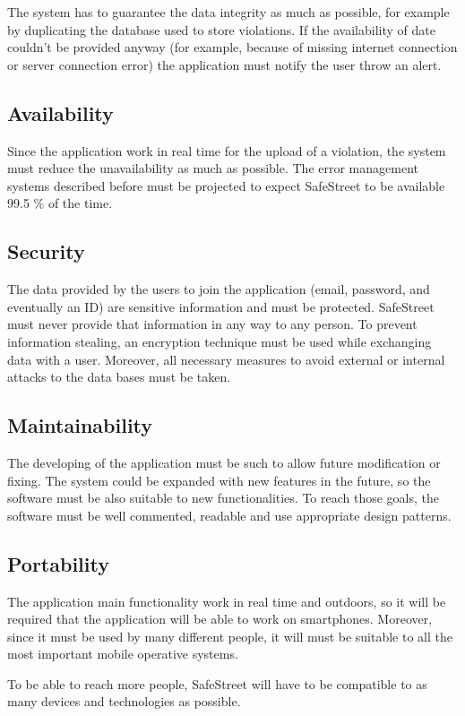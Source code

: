 \documentclass[../RASD.tex]{subfiles}
\begin{document}
            The system has to guarantee the data integrity as much as possible, for example by duplicating the database used to store violations. If the availability of date couldn’t be provided anyway (for example, because of missing internet connection or server connection error) the application must notify the user throw an alert.
            \subsection{Availability}\label{subsec:availability}
            Since the application work in real time for the upload of a violation, the system must reduce the unavailability as much as possible. The error management systems described before must be projected to expect SafeStreet to be available 99.5 \% of the time.
                    \subsection{Security}\label{subsec:security}
            The data provided by the users to join the application (email, password, and eventually an ID) are sensitive information and must be protected. SafeStreet must never provide that information in any way to any person. To prevent information stealing, an encryption technique must be used while exchanging data with a user. Moreover, all necessary measures to avoid external or internal attacks to the data bases must be taken.
            \subsection{Maintainability}\label{subsec:maintainability}
            The developing of the application must be such to allow future modification or fixing. The system could be expanded with new features in the future, so the software must be also suitable to new functionalities. To reach those goals, the software must be well commented, readable and use appropriate design patterns.
            \subsection{Portability}\label{subsec:portability}
            The application main functionality work in real time and outdoors, so it will be required that the application will be able to work on smartphones. Moreover, since it must be used by many different people, it will must be suitable to all the most important mobile operative systems.

            To be able to reach more people, SafeStreet will have to be compatible to as many devices and technologies as possible.
\end{document}
